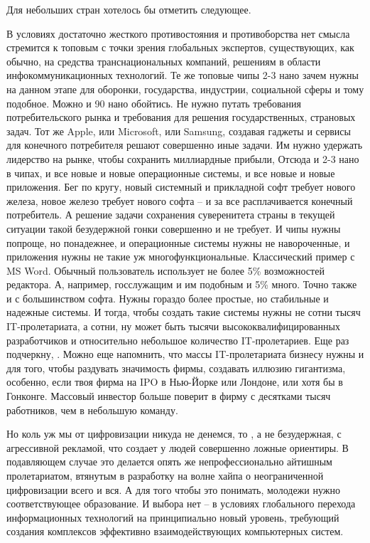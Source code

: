 \begin{partbacktext}
Для небольших стран хотелось бы отметить следующее.

В условиях достаточно жесткого противостояния и противоборства нет смысла стремится к топовым с точки зрения глобальных экспертов, существующих, как обычно, на средства транснациональных компаний, решениям в области инфокоммуникационных технологий. Те же топовые чипы 2-3 нано зачем нужны на данном этапе для оборонки, государства, индустрии, социальной сферы и тому подобное. Можно и 90 нано обойтись. Не нужно путать требования потребительского рынка и требования для решения государственных, страновых задач. Тот же Apple, или Microsoft, или Samsung, создавая гаджеты и сервисы для конечного потребителя решают совершенно иные задачи. Им нужно удержать лидерство на рынке, чтобы сохранить миллиардные прибыли, Отсюда и 2-3 нано в чипах, и все новые и новые операционные системы, и все новые и новые приложения. Бег по кругу, новый системный и прикладной софт требует нового железа, новое железо требует нового софта -- и за все расплачивается конечный потребитель. А решение задачи сохранения суверенитета страны в текущей ситуации такой безудержной гонки совершенно и не требует. И чипы нужны попроще, но понадежнее, и операционные системы нужны не навороченные, и приложения нужны не такие уж многофункциональные. Классический пример с MS Word. Обычный пользователь использует не более 5\% возможностей редактора. А, например, госслужащим и им подобным и 5\% много. Точно также и с большинством софта. Нужны гораздо более простые, но стабильные и надежные системы. И тогда, чтобы создать такие системы нужны не сотни тысяч IT-пролетариата, а сотни, ну может быть тысячи высококвалифицированных разработчиков и относительно небольшое количество IT-пролетариев. Еще раз подчеркну,   . Можно еще напомнить, что массы IT-пролетариата бизнесу нужны и для того, чтобы раздувать значимость фирмы, создавать иллюзию гигантизма, особенно, если твоя фирма на IPO в Нью-Йорке или Лондоне, или хотя бы в Гонконге. Массовый инвестор больше поверит в фирму с десятками тысяч работников, чем в небольшую команду.

Но коль уж мы от цифровизации никуда не денемся, то   , а не безудержная, с агрессивной рекламой, что создает у людей совершенно ложные ориентиры. В подавляющем случае это делается опять же непрофессионально айтишным пролетариатом, втянутым в разработку на волне хайпа о неограниченной цифровизации всего и вся. А для того чтобы это понимать, молодежи нужно соответствующее образование. И выбора нет --            в условиях глобального перехода информационных технологий на принципиально новый уровень, требующий создания комплексов эффективно взаимодействующих компьютерных систем.
 

\end{partbacktext}
